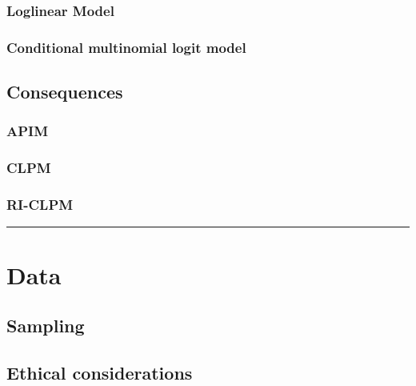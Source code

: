 \documentclass[
]{book}
\begin{document}
\hypertarget{loglinear-model}{%
\subsection{Loglinear Model}\label{loglinear-model}}

\hypertarget{conditional-multinomial-logit-model}{%
\subsection{Conditional multinomial logit model}\label{conditional-multinomial-logit-model}}

\hypertarget{consequences}{%
\section{Consequences}\label{consequences}}

\hypertarget{apim}{%
\subsection{APIM}\label{apim}}

\hypertarget{clpm}{%
\subsection{CLPM}\label{clpm}}

\hypertarget{ri-clpm}{%
\subsection{RI-CLPM}\label{ri-clpm}}

\begin{center}\rule{0.5\linewidth}{0.5pt}\end{center}

\hypertarget{data}{%
\chapter{Data}\label{data}}

\hypertarget{sampling}{%
\section{Sampling}\label{sampling}}

\hypertarget{ethical-considerations}{%
\section{Ethical considerations}\label{ethical-considerations}}
\end{document}
